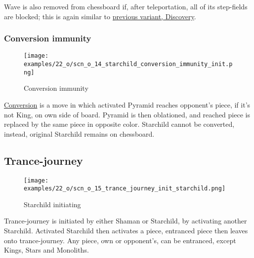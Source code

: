 Wave is also removed from chessboard if, after teleportation, all of its step-fields are
blocked; this is again similar to
\hyperref[fig:scn_d_10_teleported_wave_blocked]{previous variant, Discovery}.

\clearpage %

\subsubsection*{Conversion immunity}

\vspace*{-0.9\baselineskip}
\noindent
\begin{figure}[!h]
\texttt{[image: examples/22\_o/scn\_o\_14\_starchild\_conversion\_immunity\_init.png]}
\caption{Conversion immunity}
\label{fig:scn_o_14_starchild_conversion_immunity_init}
\end{figure}

\hyperref[sec:Mayan Ascendancy/Pyramid/Conversion]{Conversion} is a move in which activated
Pyramid reaches opponent's piece, if it's not King, on own side of board. Pyramid is then
oblationed, and reached piece is replaced by the same piece in opposite color.
Starchild cannot be converted, instead, original Starchild remains on chessboard.

\clearpage %

\subsection*{Trance-journey}

\vspace*{-0.9\baselineskip}
\noindent
\begin{wrapfigure}[11]{l}{0.4\textwidth}
\centering
\texttt{[image: examples/22\_o/scn\_o\_15\_trance\_journey\_init\_starchild.png]}
\caption{Starchild initiating}
\label{fig:scn_o_15_trance_journey_init_starchild}
\end{wrapfigure}
Trance-journey is initiated by either Shaman or Starchild, by activating another Starchild.
Activated Starchild then activates a piece, entranced piece then leaves onto trance-journey.
Any piece, own or opponent's, can be entranced, except Kings, Stars and Monoliths.

